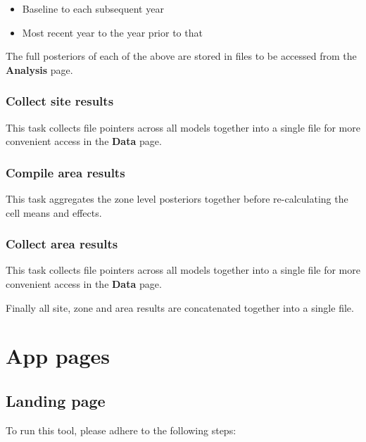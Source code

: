 \documentclass[
  8pt,
  a4paper]{article}
\providecommand{\tightlist}{%
  \setlength{\itemsep}{0pt}\setlength{\parskip}{0pt}}\usepackage{longtable,booktabs,array}
\begin{document}
\begin{itemize}
\tightlist
\item
  Baseline to each subsequent year
\item
  Most recent year to the year prior to that
\end{itemize}

The full posteriors of each of the above are stored in files to be
accessed from the \textbf{Analysis} page.

\subsubsection{Collect site results}\label{collect-site-results}

This task collects file pointers across all models together into a
single file for more convenient access in the \textbf{Data} page.

\subsubsection{Compile area results}\label{compile-area-results}

This task aggregates the zone level posteriors together before
re-calculating the cell means and effects.

\subsubsection{Collect area results}\label{collect-area-results}

This task collects file pointers across all models together into a
single file for more convenient access in the \textbf{Data} page.

Finally all site, zone and area results are concatenated together into a
single file.

\section{App pages}\label{app-pages}

\subsection{Landing page}\label{sec-landing}

To run this tool, please adhere to the following steps:
\end{document}
